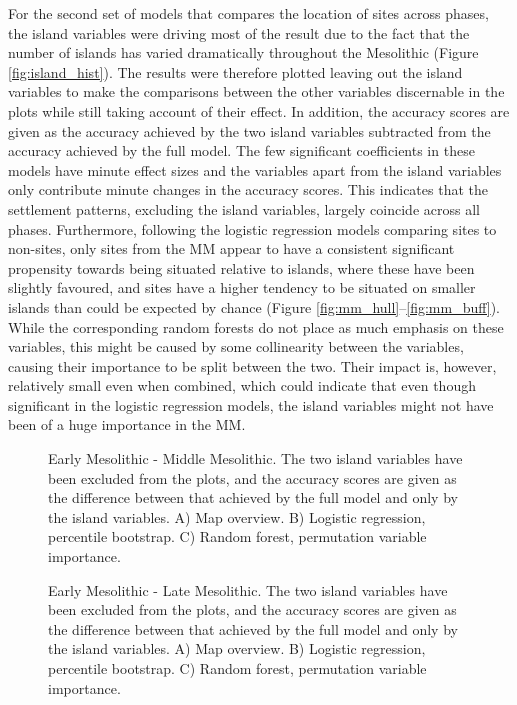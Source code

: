 \documentclass[12pt, a4paper]{article}
\begin{document}
For the second set of models that compares the location of sites across phases, the island variables were driving most of the result due to the fact that the number of islands has varied dramatically throughout the Mesolithic (Figure \ref{fig:island_hist}). The results were therefore plotted leaving out the island variables to make the comparisons between the other variables discernable in the plots while still taking account of their effect. In addition, the accuracy scores are given as the accuracy achieved by the two island variables subtracted from the accuracy achieved by the full model. The few significant coefficients in these models have minute effect sizes and the variables apart from the island variables only contribute minute changes in the accuracy scores. This indicates that the settlement patterns, excluding the island variables, largely coincide across all phases. Furthermore, following the logistic regression models comparing sites to non-sites, only sites from the MM appear to have a consistent significant propensity towards being situated relative to islands, where these have been slightly favoured, and sites have a higher tendency to be situated on smaller islands than could be expected by chance (Figure \ref{fig:mm_hull}--\ref{fig:mm_buff}). While the corresponding random forests do not place as much emphasis on these variables, this might be caused by some collinearity between the variables, causing their importance to be split between the two. Their impact is, however, relatively small even when combined, which could indicate that even though significant in the logistic regression models, the island variables might not have been of a huge importance in the MM.

\begin{figure}
	\caption[Early Mesolithic - Middle Mesolithic]{Early Mesolithic - Middle Mesolithic. The two island variables have been excluded from the plots, and the accuracy scores are given as the difference between that achieved by the full model and only by the island variables. A) Map overview. B) Logistic regression, percentile bootstrap. C) Random forest, permutation variable importance.}
	\label{fig:em_mm}
\bigbreak
	\caption[Early Mesolithic - Late Mesolithic]{Early Mesolithic - Late Mesolithic. The two island variables have been excluded from the plots, and the accuracy scores are given as the difference between that achieved by the full model and only by the island variables. A) Map overview. B) Logistic regression, percentile bootstrap. C) Random forest, permutation variable importance.}
	\label{fig:em_lm}
\end{figure}
\end{document}
